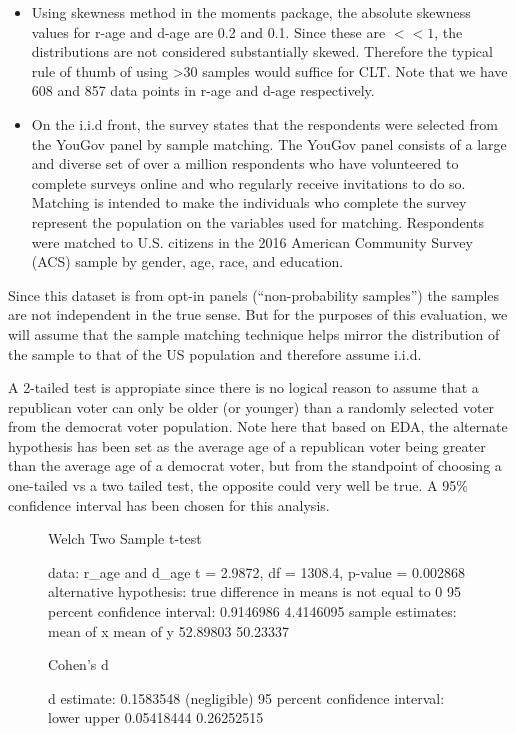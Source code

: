 \documentclass[12pt]{article}
\begin{document}
\begin{itemize}
\item Using skewness method in the moments package, the absolute skewness values for r-age and d-age are 0.2 and 0.1. Since these are $<< 1$, the distributions are not considered substantially skewed. Therefore the typical rule of thumb of using >30 samples would suffice for CLT. Note that we have 608 and 857 data points in r-age and d-age respectively.
\item On the i.i.d front, the survey states that the respondents were selected from the YouGov panel by sample matching. The YouGov panel consists of a large and diverse set of over a million respondents who have volunteered to complete surveys online and who regularly receive invitations to do so. Matching is intended to make the individuals who complete the survey represent the population on the variables used for matching. Respondents were matched to U.S. citizens in the 2016 American Community Survey (ACS) sample by gender, age, race, and education.
\end{itemize}

Since this dataset is from opt-in panels (“non-probability samples”) the samples are not independent in the true sense.   But for the purposes of this evaluation, we will assume that the sample matching technique helps mirror the distribution of the sample to that of the US population and therefore assume i.i.d. 

A 2-tailed test is appropiate since there is no logical reason to assume that a republican voter can only be older (or younger) than a randomly selected voter from the democrat voter population. Note here that based on EDA, the alternate hypothesis has been set as the average age of a republican voter being greater than the average age of a democrat voter, but from the standpoint of choosing a one-tailed vs a two tailed test, the opposite could very well be true.
A 95\% confidence interval has been chosen for this analysis.

\begin{figure}[H]
\begin{Schunk}
\begin{Soutput}
	Welch Two Sample t-test

data:  r_age and d_age
t = 2.9872, df = 1308.4, p-value = 0.002868
alternative hypothesis: true difference in means is not equal to 0
95 percent confidence interval:
 0.9146986 4.4146095
sample estimates:
mean of x mean of y 
 52.89803  50.23337 
\end{Soutput}
\begin{Soutput}
Cohen's d

d estimate: 0.1583548 (negligible)
95 percent confidence interval:
     lower      upper 
0.05418444 0.26252515 
\end{Soutput}
\end{Schunk}
\end{figure}
\end{document}
